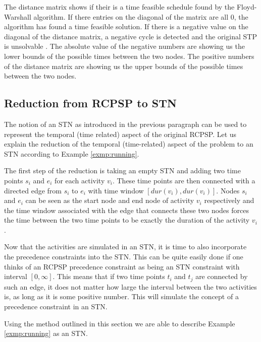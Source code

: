 \documentclass{article}
\theoremstyle{definition}
\newcommand{\dur}[1]{\ensuremath{dur(v_{#1})}} %
\begin{document}
The distance matrix shows if their is a time feasible schedule found by the Floyd-Warshall algorithm.
If there entries on the diagonal of the matrix are all $0$, the algorithm has found a time feasible solution. 
If there is a negative value on the diagonal of the distance matrix, a negative cycle is detected and the original STP is unsolvable \cite{dechter91}.
The absolute value of the negative numbers are showing us the lower bounds of the possible times between the two nodes.
The positive numbers of the distance matrix are showing us the upper bounds of the possible times between the two nodes.

\subsection{Reduction from RCPSP to STN}
The notion of an STN as introduced in the previous paragraph can be used to represent the temporal (time related) aspect of the original RCPSP. Let us explain the reduction of the temporal (time-related) aspect of the problem to an STN according to Example \ref{exmp:running}.

The first step of the reduction is taking an empty STN and adding two time points $s_i$ and $e_i$ for each activity $v_i$. 
These time points are then connected with a directed edge from $s_i$ to $e_i$ with time window $[\dur{i}, \dur{i}]$. 
Nodes $s_i$ and $e_i$ can be seen as the start node and end node of activity $v_i$ respectively and the time window associated with the edge that connects these two nodes forces the time between the two time points to be exactly the duration of the activity $v_i$.

Now that the activities are simulated in an STN, it is time to also incorporate the precedence constraints into the STN. This can be quite easily done if one thinks of an RCPSP precedence constraint as being an STN constraint with interval $[0,\infty]$. This means that if two time points $t_i$ and $t_j$ are connected by such an edge, it does not matter how large the interval between the two activities is, as long as it is some positive number. This will simulate the concept of a precedence constraint in an STN.

Using the method outlined in this section we are able to describe Example \ref{exmp:running} as an STN. 
\end{document}
